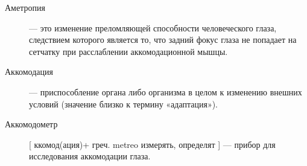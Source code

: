 \begin{description}
\item[Аметропия] --- это изменение преломляющей способности человеческого глаза, следствием которого является то, что задний фокус глаза не попадает на сетчатку при расслаблении аккомодационной мышцы.\cite{b_1}

\item[Аккомодация] --- приспособление органа либо организма в целом к изменению внешних условий (значение близко к термину «адаптация»).\cite{b_2}

\item[Аккомодометр][ ккомод(ация)+ греч. metreo измерять, определят ] --- прибор для исследования аккомодации глаза.\cite{b_3}
\end{description}